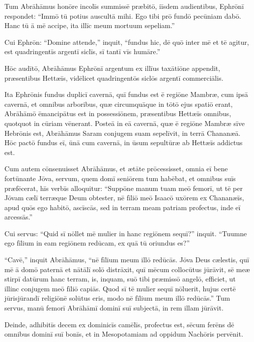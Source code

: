 \Versus Tum Abrāhāmus honōre incolīs summissē præbitō, iīsdem audientibus, Ephrōnī respondet:
\Versus ``Immō tū potius auscultā mihi. Ego tibi prō fundō pecūniam dabō. Hanc tū ā mē accipe, ita illīc meum mortuum sepeliam.''

\Versus Cui Ephrōn:
\Versus ``Domine attende,'' inquit, ``fundus hic, dē quō inter mē et tē agitur, est quadringentīs argentī siclīs, sī tantī vīs humāre.''

\Versus Hōc audītō, Abrāhāmus Ephrōnī argentum ex illīus taxātiōne appendit, præsentibus Hettæīs, vidēlicet quadringentōs siclōs argentī commerciālis.

\Versus Ita Ephrōnis fundus duplicī cavernā, quī fundus est ē regiōne Mambræ, cum ipsā cavernā, et omnibus arboribus, quæ circumquāque in tōtō ejus spatiō erant,
\Versus Abrāhāmō ēmancipātus est in possessiōnem, præsentibus Hettæīs omnibus, quotquot in cūriam vēnerant.
\Versus Posteā in eā cavernā, quæ ē regiōne Mambræ sīve Hebrōnis est,
\Versus Abrāhāmus Saram conjugem suam sepelīvit, in terrā Chananæā.
\Versus Hōc pactō fundus eī, ūnā cum cavernā, in ūsum sepultūræ ab Hettæīs addictus est.



\Caput
\Versus Cum autem cōnsenuisset Abrāhāmus, et ætāte prōcessisset, omnia eī bene fortūnante Jōva,
\Versus servum, quem domī seniōrem tum habēbat, et omnibus suīs præfēcerat, hīs verbīs alloquitur: ``Suppōne manum tuam meō femorī,
\Versus ut tē per Jōvam cælī terræque Deum obtester, nē fīliō meō Isaacō uxōrem ex Chananæīs, apud quōs ego habitō, ascīscās,
\Versus sed in terram meam patriam profectus, inde eī arcessās.''

\Versus Cui servus: ``Quid sī nōllet mē mulier in hanc regiōnem sequī?'' inquit. ``Tuumne ego fīlium in eam regiōnem redūcam, ex quā tū oriundus es?''

\Versus ``Cavē,'' inquit Abrāhāmus, ``nē fīlium meum illō redūcās.
\Versus Jōva Deus cælestis, quī mē ā domō paternā et nātālī solō distrāxit, quī mēcum collocūtus jūrāvit, sē meæ stirpī datūrum hanc terram, is, inquam, suō tibi præmissō angelō, efficiet, ut illinc conjugem meō fīliō capiās.
\Versus Quod sī tē mulier sequī nōluerit, hujus certē jūrisjūrandī religiōnē solūtus eris, modo nē fīlium meum illō redūcās.''
\Versus Tum servus, manū femorī Abrāhāmī dominī suī subjectā, in rem illam jūrāvit.

\Versus Deinde, adhibitīs decem ex dominicīs camēlīs, profectus est, sēcum ferēns dē omnibus dominī suī bonīs, et in Mesopotamiam ad oppidum Nachōris pervēnit.

